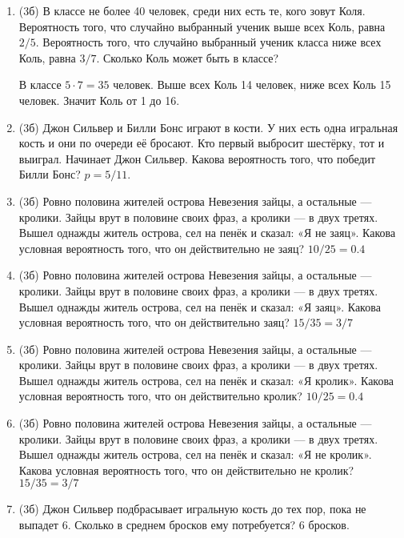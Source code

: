 \documentclass[a4paper, 12pt]{article}
\begin{document}
\newpage
\begin{enumerate}
\item (3б) В классе не более 40 человек, среди них есть те, кого зовут Коля. Вероятность того, что случайно выбранный ученик выше всех Коль, равна $2/5$. Вероятность того, что случайно выбранный ученик класса ниже всех Коль, равна $3/7$. Сколько Коль может быть в классе?

В классе $5\cdot 7=35$ человек. Выше всех Коль 14 человек, ниже всех Коль 15 человек. Значит Коль от 1 до 16.
\item (3б) Джон Сильвер и Билли Бонс играют в кости. У них есть одна игральная кость и они по очереди её бросают. Кто первый выбросит шестёрку, тот и выиграл. Начинает Джон Сильвер. Какова вероятность того, что победит Билли Бонс? $p=5/11$.
\item (3б) Ровно половина жителей острова Невезения зайцы, а остальные — кролики. Зайцы врут в половине своих фраз, а кролики — в двух третях. Вышел однажды житель острова, сел на пенёк и сказал: «Я не заяц». Какова условная вероятность того, что он действительно не заяц? $10/25=0.4$
\item (3б) Ровно половина жителей острова Невезения зайцы, а остальные — кролики. Зайцы врут в половине своих фраз, а кролики — в двух третях. Вышел однажды житель острова, сел на пенёк и сказал: «Я заяц». Какова условная вероятность того, что он действительно заяц? $15/35=3/7$
\item (3б) Ровно половина жителей острова Невезения зайцы, а остальные — кролики. Зайцы врут в половине своих фраз, а кролики — в двух третях. Вышел однажды житель острова, сел на пенёк и сказал: «Я кролик». Какова условная вероятность того, что он действительно кролик? $10/25=0.4$
\item (3б) Ровно половина жителей острова Невезения зайцы, а остальные — кролики. Зайцы врут в половине своих фраз, а кролики — в двух третях. Вышел однажды житель острова, сел на пенёк и сказал: «Я не кролик». Какова условная вероятность того, что он действительно не кролик? $15/35=3/7$
\item (3б) Джон Сильвер подбрасывает игральную кость до тех пор, пока не выпадет 6. Сколько в среднем бросков ему потребуется? $6$ бросков.

\end{enumerate}
\end{document}
